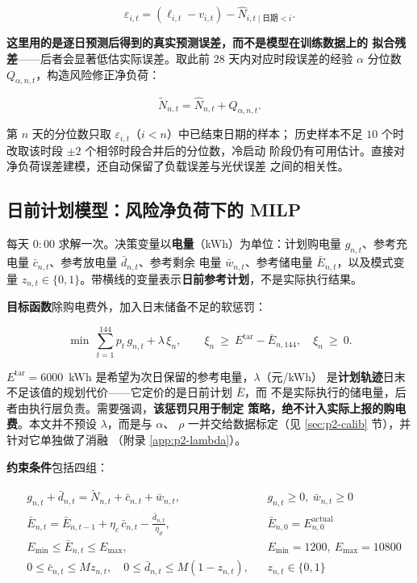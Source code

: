 \documentclass[withoutpreface,bwprint]{cumcmthesis}
\begin{document}
\begin{equation}
  \varepsilon_{i,t}=(\ell_{i,t}-v_{i,t})-\widehat N_{i,t\mid\text{日期}<i} .
  \label{eq:p2-error}
\end{equation}

\textbf{这里用的是逐日预测后得到的真实预测误差，而不是模型在训练数据上的
拟合残差}——后者会显著低估实际误差。取此前 $28$ 天内对应时段误差的经验
$\alpha$ 分位数 $Q_{\alpha,n,t}$，构造风险修正净负荷：

\begin{equation}
  \widetilde N_{n,t}=\widehat N_{n,t}+Q_{\alpha,n,t} .
  \label{eq:p2-risk}
\end{equation}

第 $n$ 天的分位数只取 $\varepsilon_{i,t}$（$i<n$）中已结束日期的样本；
历史样本不足 $10$ 个时改取该时段 $\pm2$ 个相邻时段合并后的分位数，冷启动
阶段仍有可用估计。直接对净负荷误差建模，还自动保留了负载误差与光伏误差
之间的相关性。

\subsection{日前计划模型：风险净负荷下的 MILP}

每天 $0{:}00$ 求解一次。决策变量以\textbf{电量}（kWh）为单位：计划购电量
$g_{n,t}$、参考充电量 $\bar c_{n,t}$、参考放电量 $\bar d_{n,t}$、参考剩余
电量 $\bar w_{n,t}$、参考储电量 $\bar E_{n,t}$，以及模式变量
$z_{n,t}\in\{0,1\}$。带横线的变量表示\textbf{日前参考计划}，不是实际执行结果。

\textbf{目标函数}除购电费外，加入日末储备不足的软惩罚：

\begin{equation}
  \min\ \sum_{t=1}^{144}p_t\,g_{n,t}+\lambda\,\xi_n,
  \qquad
  \xi_n\ \ge\ E^{\mathrm{tar}}-\bar E_{n,144},\quad \xi_n\ \ge\ 0 .
  \label{eq:p2-obj}
\end{equation}

$E^{\mathrm{tar}}=6000$~kWh 是希望为次日保留的参考电量，$\lambda$（元/kWh）
是\textbf{计划轨迹}日末不足该值的规划代价——它定价的是日前计划 $\bar E$，而
不是实际执行的储电量，后者由执行层负责。需要强调，\textbf{该惩罚只用于制定
策略，绝不计入实际上报的购电费}。本文并不预设 $\lambda$，而是与 $\alpha$、
$\rho$ 一并交给数据标定（见 \ref{sec:p2-calib} 节），并针对它单独做了消融
（附录 \ref{app:p2-lambda}）。

\textbf{约束条件}包括四组：

\begin{equation}
\begin{aligned}
  & g_{n,t}+\bar d_{n,t}=\widetilde N_{n,t}+\bar c_{n,t}+\bar w_{n,t},
  && g_{n,t}\ge0,\ \bar w_{n,t}\ge0 \\
  & \bar E_{n,t}=\bar E_{n,t-1}+\eta_c\,\bar c_{n,t}
    -\frac{\bar d_{n,t}}{\eta_d},
  && \bar E_{n,0}=E_{n,0}^{\mathrm{actual}} \\
  & E_{\min}\le\bar E_{n,t}\le E_{\max},
  && E_{\min}=1200,\ E_{\max}=10800 \\
  & 0\le\bar c_{n,t}\le M z_{n,t},\quad
    0\le\bar d_{n,t}\le M(1-z_{n,t}),
  && z_{n,t}\in\{0,1\}
\end{aligned}
\label{eq:p2-model}
\end{equation}
\end{document}
